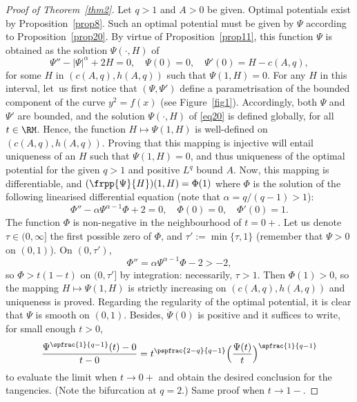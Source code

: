 \begin{proof}[Proof of Theorem~\ref{thm2}]
Let $q>1$ and $A>0$ be given.
Optimal potentials exist by
Proposition~\ref{prop8}.
Such an optimal potential must be given by $\Psi$ according to Proposition~\ref{prop20}.
By virtue of Proposition~\ref{prop11},
this function $\Psi$ is obtained as the solution $\Psi(\cdot,H)$ of
\begin{equation} \label{eq20}
\Psi''-|\Psi|^\alpha+2H = 0,\quad \Psi(0)=0,\quad \Psi'(0)=H-c(A,q),
\end{equation}
for some $H$ in $(c(A,q),h(A,q))$ such that $\Psi(1,H)=0$. For any $H$ in this
interval, let~us first notice that $(\Psi,\Psi')$ define a parametrisation of
the bounded component of the curve $y^2=f(x)$ (see Figure~\ref{fig1}). Accordingly,
both $\Psi$ and $\Psi'$ are bounded, and the solution $\Psi(\cdot,H)$ of \eqref{eq20}
is defined globally, for all $t \in \RM$. Hence, the function $H \mapsto \Psi(1,H)$ is
well-defined on $(c(A,q),h(A,q))$. Proving that this mapping is injective will entail
uniqueness of an $H$ such that $\Psi(1,H)=0$, and thus uniqueness of the optimal
potential for the given $q>1$ and positive $L^q$ bound $A$. Now, this mapping is
differentiable, and $(\frpp{\Psi}{H})(1,H)=\Phi(1)$ where $\Phi$ is the solution of
the following linearised differential equation (note that $\alpha=q/(q-1)>1$):
\[
\Phi''-\alpha\Psi^{\alpha-1}\Phi+2 = 0,\quad \Phi(0)=0,\quad \Phi'(0)=1.
\]
The function $\Phi$ is non-negative in the neighbourhood of $t=0+$.
Let us denote $\tau \in
(0,\infty]$ the first possible zero of $\Phi$, and $\tau':=\min\{\tau,1\}$ (remember
that $\Psi>0$ on $(0,1)$). On $(0,\tau')$,
\[
\Phi'' = \alpha\Psi^{\alpha-1}\Phi-2 > -2,
\]
so $\Phi > t(1-t)$ on $(0,\tau']$ by integration: necessarily, $\tau>1$. Then
$\Phi(1)>0$, so the mapping $H \mapsto \Psi(1,H)$ is strictly increasing on
$(c(A,q),h(A,q))$ and uniqueness is proved.
Regarding the regularity of the optimal potential, it is clear that
$\Psi$ is smooth on $(0,1)$. Besides, $\dot{\Psi}(0)$ is
positive and it suffices to write, for small enough $t>0$,
\[
\frac{\Psi^{\spfrac{1}{q-1}}(t)-0}{t-0}
= t^\pspfrac{2-q}{q-1} \Bigl(\frac{\Psi(t)}{t} \Bigr)^{\spfrac{1}{q-1}}
\]
to evaluate the limit when $t \to 0+$ and obtain the desired conclusion for the
tangencies. (Note the bifurcation at $q=2$.) Same proof when $t \to 1-$.
\end{proof}

